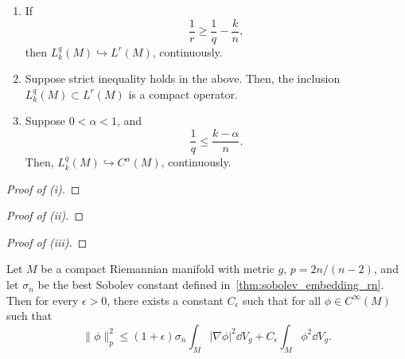 \begin{theorem} \leavevmode
  \label{thm:sobolev_embedding_compact}

  \begin{enumerate}
    \item If
      \[%
        \frac{1}{r} \ge \frac{1}{q} - \frac{k}{n}
      ,\]%
      then $L^q_k(M) \hookrightarrow L^r(M)$, continuously.

    \item Suppose strict inequality holds in the above. Then, the inclusion $L^q_k(M) \subset L^r(M)$ is a compact operator.

    \item Suppose $0 < \alpha < 1$, and
      \[%
        \frac{1}{q} \le \frac{k - \alpha}{n}
      .\]%
      Then, $L^q_k(M) \hookrightarrow C^\alpha(M)$, continuously.
  \end{enumerate}
\end{theorem}

\begin{computational-work}\leavevmode
  \label{cw:sobolev_embedding_compact}
\end{computational-work}

\begin{proof}[Proof of (i)]
\end{proof}

\begin{proof}[Proof of (ii)]
\end{proof}

\begin{proof}[Proof of (iii)]
\end{proof}

\begin{theorem}[Aubin]
  \label{thm:aubin}

  Let $M$ be a compact Riemannian manifold with metric $g$, $p = 2n/(n - 2)$, and let $\sigma_n$ be the best Sobolev constant defined in~\cref{thm:sobolev_embedding_rn}. Then for every $\epsilon > 0$, there exists a constant $C_\epsilon$ such that for all $\phi \in C^\infty(M)$ such that
  \[%
    \|\phi\|^2_p \le (1 + \epsilon) \sigma_n \int_M |\nabla \phi|^2 \dd{V}_g + C_\epsilon \int_M \phi^2 \dd{V}_g
  .\]%
\end{theorem}

